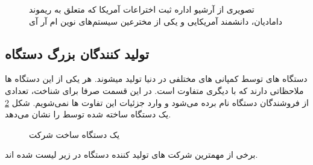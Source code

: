 \begin{figure}
	\centering
	{}
	\caption{تصویری از آرشیو اداره ثبت اختراعات آمریکا که متعلق به ریموند دامادیان، دانشمند آمریکایی و یکی از مخترعین سیستم‌های نوین ام آر آی}
	\label{fig:Damadian_invention}
\end{figure}


\subsection{تولید کنندگان بزرگ دستگاه \mri}

دستگاه های \mri توسط کمپانی های مختلفی در دنیا تولید ‌میشوند. هر یکی از این دستگاه ها ملاحظاتی دارند که با دیگری متفاوت است. در این قسمت صرفا برای شناخت، تعدادی از فروشندگان دستگاه \mri
{}
 نام برده می‌شود و وارد جزئیات این تفاوت ها نمی‌شویم.  
 شکل \ref{fig:siemens-espree-mri}
یک دستگاه \mri ساخته شده توسط 
را نشان می‌دهد.

\begin{figure}[t!]
	\centering
	\removevspace[1]
	\caption{یک دستگاه \mri ساخت شرکت }
	\label{fig:siemens-espree-mri}
\end{figure}


برخی از مهمترین شرکت های تولید کننده دستگاه \mri در زیر لیست شده اند.

